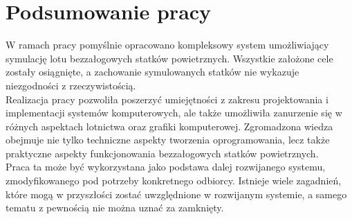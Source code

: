 \section{Podsumowanie pracy}


W ramach pracy pomyślnie opracowano kompleksowy system umożliwiający symulację lotu bezzałogowych statków powietrznych. Wszystkie założone cele zostały osiągnięte, a zachowanie symulowanych statków nie wykazuje niezgodności z rzeczywistością.\\

Realizacja pracy pozwoliła poszerzyć umiejętności z zakresu projektowania i implementacji systemów komputerowych, ale także umożliwiła zanurzenie się w różnych aspektach lotnictwa oraz grafiki komputerowej. Zgromadzona wiedza obejmuje nie tylko techniczne aspekty tworzenia oprogramowania, lecz także praktyczne aspekty funkcjonowania bezzałogowych statków powietrznych.\\

Praca ta może być wykorzystana jako podstawa dalej rozwijanego systemu, zmodyfikowanego pod potrzeby konkretnego odbiorcy. Istnieje wiele zagadnień, które mogą w przyszłości zostać uwzględnione w rozwijanym systemie, a samego tematu z pewnością nie można uznać za zamknięty.
